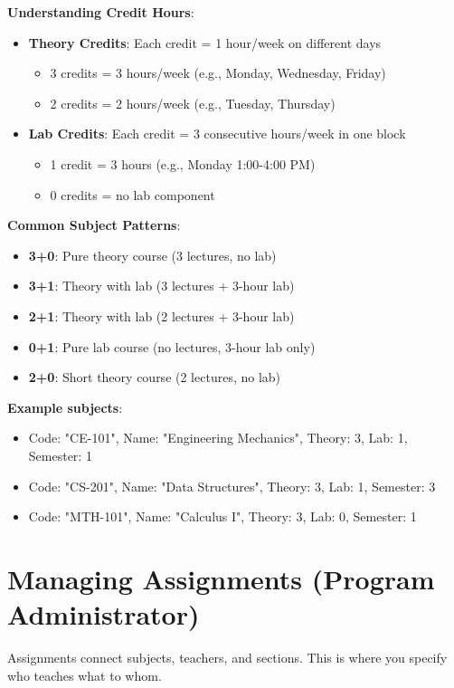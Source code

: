 \documentclass[12pt,a4paper]{article}
\begin{document}
\textbf{Understanding Credit Hours}:
\begin{itemize}
\item \textbf{Theory Credits}: Each credit = 1 hour/week on different days
\begin{itemize}
\item 3 credits = 3 hours/week (e.g., Monday, Wednesday, Friday)
\item 2 credits = 2 hours/week (e.g., Tuesday, Thursday)
\end{itemize}
\item \textbf{Lab Credits}: Each credit = 3 consecutive hours/week in one block
\begin{itemize}
\item 1 credit = 3 hours (e.g., Monday 1:00-4:00 PM)
\item 0 credits = no lab component
\end{itemize}
\end{itemize}

\textbf{Common Subject Patterns}:
\begin{itemize}
\item \textbf{3+0}: Pure theory course (3 lectures, no lab)
\item \textbf{3+1}: Theory with lab (3 lectures + 3-hour lab)
\item \textbf{2+1}: Theory with lab (2 lectures + 3-hour lab)
\item \textbf{0+1}: Pure lab course (no lectures, 3-hour lab only)
\item \textbf{2+0}: Short theory course (2 lectures, no lab)
\end{itemize}

\textbf{Example subjects}:
\begin{itemize}
\item Code: "CE-101", Name: "Engineering Mechanics", Theory: 3, Lab: 1, Semester: 1
\item Code: "CS-201", Name: "Data Structures", Theory: 3, Lab: 1, Semester: 3
\item Code: "MTH-101", Name: "Calculus I", Theory: 3, Lab: 0, Semester: 1
\end{itemize}

\section{Managing Assignments (Program Administrator)}

Assignments connect subjects, teachers, and sections. This is where you specify who teaches what to whom.
\end{document}
